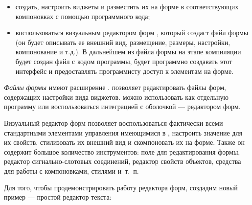 \begin{itemize}
\item создать, настроить виджеты и разместить их на форме в соответствующих компоновках с помощью программного кода;
\item воспользоваться визуальным редактором форм , который создаст файл формы (он будет описывать ее внешний
вид, размещение, размеры, настройки, компонование и т.д.). В дальнейшем из файла формы на этапе компиляции будет создан
файл с кодом программы, будет программно создавать этот интерфейс и предоставлять программисту доступ к элементам на
форме.
\end{itemize}
\emph{Файлы }\emph{формы} имеют расширение .  позволяет
редактировать файлы форм, содержащих настройки вида виджетов.  можно использовать как отдельную программу
или воспользоваться интеграцией с оболочкой  --- редактором форм.

Визуальный редактор форм позволяет воспользоваться фактически всеми стандартными элементами
управления имеющимися в , настроить значение для их свойств, стилизовать их внешний вид и скомпоновать их на форме.
Также он содержит большое количество инструментов: поле для редактирования формы, редактор сигнально-слотовых
соединений, редактор свойств объектов, средства для работы с компоновками, стилями и~т.~п.

Для того, чтобы продемонстрировать работу редактора форм, создадим новый пример --- простой редактор текста:

